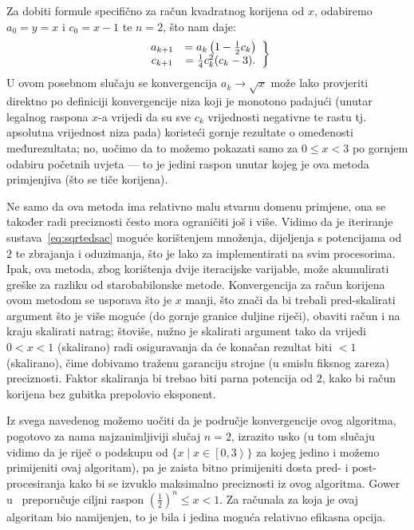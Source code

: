 \documentclass[12pt]{scrartcl}
\begin{document}
Za dobiti formule specifično za račun kvadratnog korijena od $x$, odabiremo $a_0=y=x$ i $c_0=x-1$ te $n=2$, što nam daje:
\begin{equation}
\left.
    \begin{array}{cc}
    \label{eq:sqrtedsac}
        a_{k+1} &= a_k\left(1-\frac12 c_k\right)\\
        c_{k+1} &= \frac14 c^2_k(c_k-3)\text.
\end{array}\right\}
\end{equation}
U ovom posebnom slučaju se konvergencija $a_k\to\sqrt x$ može lako provjeriti direktno po definiciji konvergencije
niza koji je monotono padajući (unutar legalnog raspona $x$-a vrijedi da su sve $c_k$ vrijednosti negativne te rastu tj.
apsolutna vrijednost niza pada) koristeći gornje rezultate o omeđenosti međurezultata; no, uočimo da to možemo pokazati
samo za $0\leq x<3$ po gornjem odabiru početnih uvjeta --- to je jedini raspon unutar kojeg je ova metoda primjenjiva (što se tiče korijena).

Ne samo da ova metoda ima relativno malu stvarnu domenu primjene, ona se također radi preciznosti često mora ograničiti još i više.
Vidimo da je iteriranje sustava~\eqref{eq:sqrtedsac} moguće korištenjem množenja, dijeljenja s potencijama od $2$ te zbrajanja i oduzimanja, što
je lako za implementirati na svim procesorima. Ipak, ova metoda, zbog korištenja dvije iteracijske varijable, može akumulirati greške za razliku
od starobabilonske metode. Konvergencija za račun korijena ovom metodom se usporava što je $x$ manji, što znači da bi trebali pred-skalirati argument
što je više moguće (do gornje granice duljine riječi), obaviti račun i na kraju skalirati natrag; štoviše, nužno je
skalirati argument tako da vrijedi $0<x<1$ (skalirano) radi osiguravanja da će konačan rezultat biti $<1$ (skalirano), čime dobivamo
traženu garanciju strojne (u smislu fiksnog zareza) preciznosti. 
Faktor skaliranja bi trebao biti parna potencija od $2$,
kako bi račun korijena bez gubitka prepolovio eksponent.

Iz svega navedenog možemo uočiti da je područje konvergencije ovog algoritma, pogotovo za nama najzanimljiviji slučaj $n=2$, izrazito usko
(u tom slučaju vidimo da je riječ o podskupu od $\{x\mid x\in\left[0,3\right>\}$ za kojeg jedino i možemo primijeniti ovaj algoritam), pa je
zaista bitno primijeniti dosta pred- i post-procesiranja kako bi se izvuklo maksimalno preciznosti iz ovog algoritma.
Gower u~\cite{gower} preporučuje ciljni raspon $(\frac12)^n\leq x<1$.
Za računala za koja je
ovaj algoritam bio
namijenjen, to je bila i jedina moguća relativno efikasna opcija.
\end{document}
